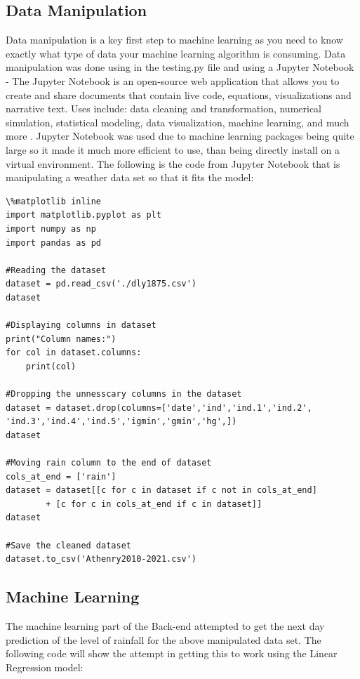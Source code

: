 \subsection{Data Manipulation}
Data manipulation is a key first step to machine learning as you need to know exactly what type of data your machine learning algorithm is consuming. Data manipulation was done using in the testing.py file and using a Jupyter Notebook - The Jupyter Notebook is an open-source web application that allows you to create and share documents that contain live code, equations, visualizations and narrative text. Uses include: data cleaning and transformation, numerical simulation, statistical modeling, data visualization, machine learning, and much more \cite{JNotebook}. Jupyter Notebook was used due to machine learning packages being quite large so it made it much more efficient to use, than being directly install on a virtual environment. The following is the code from Jupyter Notebook that is manipulating a weather data set so that it fits the model:

\begin{verbatim}
\%matplotlib inline
import matplotlib.pyplot as plt
import numpy as np
import pandas as pd

#Reading the dataset 
dataset = pd.read_csv('./dly1875.csv')
dataset 

#Displaying columns in dataset
print("Column names:")
for col in dataset.columns:    
    print(col)
    
#Dropping the unnesscary columns in the dataset
dataset = dataset.drop(columns=['date','ind','ind.1','ind.2',
'ind.3','ind.4','ind.5','igmin','gmin','hg',])
dataset

#Moving rain column to the end of dataset
cols_at_end = ['rain']
dataset = dataset[[c for c in dataset if c not in cols_at_end] 
        + [c for c in cols_at_end if c in dataset]]
dataset

#Save the cleaned dataset 
dataset.to_csv('Athenry2010-2021.csv')

\end{verbatim}

\subsection{Machine Learning}
The machine learning part of the Back-end attempted to get the next day prediction of the level of rainfall for the above manipulated data set. The following code will show the attempt in getting this to work using the Linear Regression model:

